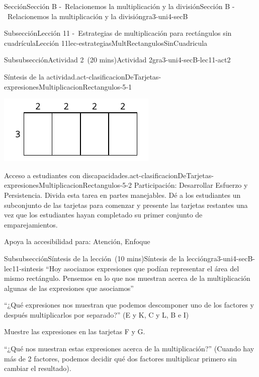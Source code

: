 \documentclass[oneside,10pt,]{article}
\begin{document}
\begin{sectionptx}{Sección}{Sección B -~Relacionemos la multiplicación y la división}{}{Sección B -~Relacionemos la multiplicación y la división}{}{}{gra3-uni4-secB}
\begin{subsectionptx}{Subsección}{Lección 11 -~Estrategias de multiplicación para rectángulos sin cuadrícula}{}{Lección 11}{}{}{lec-estrategiasMultRectangulosSinCuadricula}
\begin{subsubsectionptx}{Subsubsección}{Actividad 2~(20 mins)}{}{Actividad 2}{}{}{gra3-uni4-secB-lec11-act2}
\begin{paragraphs}{Síntesis de la actividad.}{act-clasificacionDeTarjetas-expresionesMultiplicacionRectangulos-5-1}
\begin{itemize}[label=\textbullet]
\begin{itemize}[label=$\circ$]
\begin{image}{0}{1}{0}{}
\includegraphics[width=\linewidth]{external/svg-source/tikz-file-158675.pdf}
\end{image}%
\end{itemize}
\end{itemize}
\end{paragraphs}%
\begin{paragraphs}{Acceso a estudiantes con discapacidades.}{act-clasificacionDeTarjetas-expresionesMultiplicacionRectangulos-5-2}%
Participación: Desarrollar Esfuerzo y Persistencia. Divida esta tarea en partes manejables. Dé a los estudiantes un subconjunto de las tarjetas para comenzar y presente las tarjetas restantes una vez que los estudiantes hayan completado su primer conjunto de emparejamientos.%
\par
Apoya la accesibilidad para: Atención, Enfoque%
\end{paragraphs}%
\end{subsubsectionptx}
%
%
\typeout{************************************************}
\typeout{************************************************}
%
\begin{subsubsectionptx}{Subsubsección}{Síntesis de la lección~(10 mins)}{}{Síntesis de la lección}{}{}{gra3-uni4-secB-lec11-sintesis}
``Hoy asociamos expresiones que podían representar el área del mismo rectángulo. Pensemos en lo que nos muestran acerca de la multiplicación algunas de las expresiones que asociamos''%
\par
``¿Qué expresiones nos muestran que podemos descomponer uno de los factores y después multiplicarlos por separado?'' (E y K, C y L, B e I)%
\par
Muestre las expresiones en las tarjetas F y G.%
\par
``¿Qué nos muestran estas expresiones acerca de la multiplicación?'' (Cuando hay más de 2 factores, podemos decidir qué dos factores multiplicar primero sin cambiar el resultado).%
\end{subsubsectionptx}

\end{subsectionptx}
\end{sectionptx}
\end{document}
